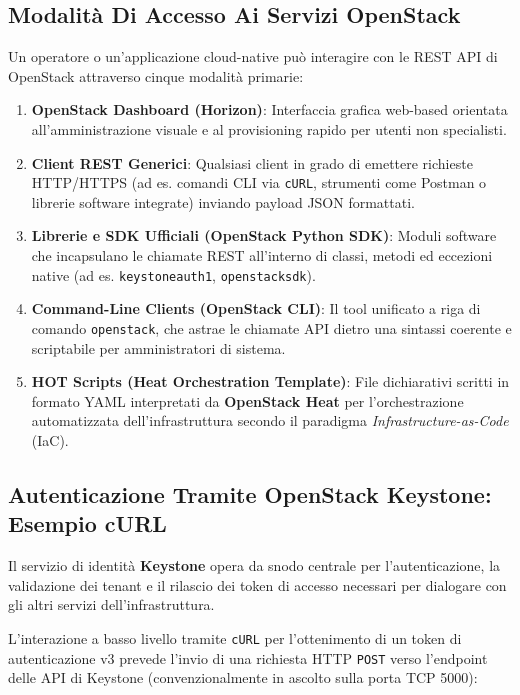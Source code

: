 \documentclass[11pt, a4paper]{article}
\begin{document}
\subsection{Modalità Di Accesso Ai Servizi OpenStack}

Un operatore o un'applicazione cloud-native può interagire con le REST API di OpenStack attraverso cinque modalità primarie:
\begin{enumerate}
    \item \textbf{OpenStack Dashboard (Horizon)}: Interfaccia grafica web-based orientata all'amministrazione visuale e al provisioning rapido per utenti non specialisti.
    \item \textbf{Client REST Generici}: Qualsiasi client in grado di emettere richieste HTTP/HTTPS (ad es. comandi CLI via \texttt{cURL}, strumenti come Postman o librerie software integrate) inviando payload JSON formattati.
    \item \textbf{Librerie e SDK Ufficiali (OpenStack Python SDK)}: Moduli software che incapsulano le chiamate REST all'interno di classi, metodi ed eccezioni native (ad es. \texttt{keystoneauth1}, \texttt{openstacksdk}).
    \item \textbf{Command-Line Clients (OpenStack CLI)}: Il tool unificato a riga di comando \texttt{openstack}, che astrae le chiamate API dietro una sintassi coerente e scriptabile per amministratori di sistema.
    \item \textbf{HOT Scripts (Heat Orchestration Template)}: File dichiarativi scritti in formato YAML interpretati da \textbf{OpenStack Heat} per l'orchestrazione automatizzata dell'infrastruttura secondo il paradigma \emph{Infrastructure-as-Code} (IaC).
\end{enumerate}

\subsection{Autenticazione Tramite OpenStack Keystone: Esempio cURL}

Il servizio di identità \textbf{Keystone} opera da snodo centrale per l'autenticazione, la validazione dei tenant e il rilascio dei token di accesso necessari per dialogare con gli altri servizi dell'infrastruttura.

L'interazione a basso livello tramite \texttt{cURL} per l'ottenimento di un token di autenticazione v3 prevede l'invio di una richiesta HTTP \texttt{POST} verso l'endpoint delle API di Keystone (convenzionalmente in ascolto sulla porta TCP 5000):
\end{document}
